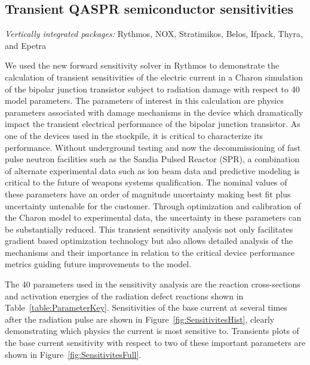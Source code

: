 \documentclass[pdf,ps2pdf,11pt]{SANDreport}
\begin{document}



%
\subsection{Transient QASPR semiconductor sensitivities}
%

{}\noindent\textit{Vertically integrated packages:} Rythmos, NOX, Stratimikos,
Belos, Ifpack, Thyra, and Epetra

We used the new forward sensitivity solver in Rythmos to demonstrate the
calculation of transient sensitivities of the electric current in a Charon
simulation of the bipolar junction transistor subject to radiation damage
with respect to 40 model parameters.  The parameters of interest in this 
calculation are physics parameters associated
with damage mechanisms in the device which dramatically impact the transient
electrical performance of the bipolar junction transistor.  As one of the 
devices used in the stockpile, it is critical to characterize its performance.
Without underground testing and now the decommissioning of fast pulse
neutron facilities such as the Sandia Pulsed Reactor (SPR), a combination of
alternate experimental data such as ion beam data and predictive modeling
is critical to the future of weapons systems qualification.  The nominal values
of these parameters have an order of magnitude uncertainty making best fit
plus uncertainty untenable for the customer.  Through optimization and calibration
of the Charon model to experimental data, the uncertainty in these parameters
can be substantially reduced.  This transient sensitivity analysis not only
facilitates gradient based optimization technology but also allows detailed
analysis of the mechanisms and their importance in relation to the critical
device performance metrics guiding future improvements to the model.

The 40 parameters used in the sensitivity analysis are the reaction 
cross-sections and activation energies of the radiation defect reactions
shown in Table~\ref{table:ParameterKey}.  Sensitivities of the base current
at several times after the radiation pulse are shown in 
Figure~\ref{fig:SensitivitesHist}, clearly demonstrating which physics the
current is most sensitive to.  Transients plots of the base current
sensitivity with respect to two of these important parameters are shown in
Figure~\ref{fig:SensitivitesFull}.
\end{document}
